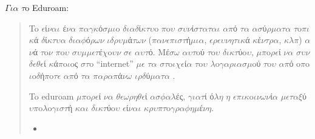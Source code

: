 \documentclass[a4paper,11pt,english]{sphinxmanual}
\begin{document}
\(\Gamma\)\(\iota\)\(\alpha\) \(\tau\)o Eduroam:
\begin{quote}

To  \(\epsilon\)ί\(\nu\)\(\alpha\)\(\iota\) έ\(\nu\)\(\alpha\) \(\pi\)\(\alpha\)\(\gamma\)\(\kappa\)ό\(\sigma\)\(\mu\)\(\iota\)o \(\delta\)\(\iota\)\(\alpha\)\(\delta\)ί\(\kappa\)\(\tau\)\(\upsilon\)o \(\pi\)o\(\upsilon\) \(\sigma\)\(\upsilon\)\(\nu\)ί\(\sigma\)\(\tau\)\(\alpha\)\(\tau\)\(\alpha\)\(\iota\) \(\alpha\)\(\pi\)ό \(\tau\)\(\alpha\) \(\alpha\)\(\sigma\)ύ\(\rho\)\(\mu\)\(\alpha\)\(\tau\)\(\alpha\) \(\tau\)o\(\pi\)\(\iota\)\(\kappa\)ά \(\delta\)ί\(\kappa\)\(\tau\)\(\upsilon\)\(\alpha\) \(\delta\)\(\iota\)\(\alpha\)\(\phi\)ό\(\rho\)\(\omega\)\(\nu\) \(\iota\)\(\delta\)\(\rho\)\(\upsilon\)\(\mu\)ά\(\tau\)\(\omega\)\(\nu\) (\(\pi\)\(\alpha\)\(\nu\)\(\epsilon\)\(\pi\)\(\iota\)\(\sigma\)\(\tau\)ή\(\mu\)\(\iota\)\(\alpha\), \(\epsilon\)\(\rho\)\(\epsilon\)\(\upsilon\)\(\nu\)\(\eta\)\(\tau\)\(\iota\)\(\kappa\)ά \(\kappa\)έ\(\nu\)\(\tau\)\(\rho\)\(\alpha\), \(\kappa\)\(\lambda\)\(\pi\)) \(\alpha\)\(\nu\)ά \(\tau\)o\(\nu\)  \(\pi\)o\(\upsilon\) \(\sigma\)\(\upsilon\)\(\mu\)\(\mu\)\(\epsilon\)\(\tau\)έ\(\chi\)o\(\upsilon\)\(\nu\) \(\sigma\)\(\epsilon\) \(\alpha\)\(\upsilon\)\(\tau\)ό. Mέ\(\sigma\)\(\omega\) \(\alpha\)\(\upsilon\)\(\tau\)oύ \(\tau\)o\(\upsilon\) \(\delta\)\(\iota\)\(\kappa\)\(\tau\)ύo\(\upsilon\), \(\mu\)\(\pi\)o\(\rho\)\(\epsilon\)ί \(\nu\)\(\alpha\) \(\sigma\)\(\upsilon\)\(\nu\)\(\delta\)\(\epsilon\)\(\theta\)\(\epsilon\)ί \(\kappa\)ά\(\pi\)o\(\iota\)oς \(\sigma\)\(\tau\)o “internet” \(\mu\)\(\epsilon\) \(\tau\)\(\alpha\) \(\sigma\)\(\tau\)o\(\iota\)\(\chi\)\(\epsilon\)ί\(\alpha\) \(\tau\)o\(\upsilon\) \(\lambda\)o\(\gamma\)\(\alpha\)\(\rho\)\(\iota\)\(\alpha\)\(\sigma\)\(\mu\)oύ \(\tau\)o\(\upsilon\) \(\alpha\)\(\pi\)ό o\(\pi\)o\(\iota\)o\(\delta\)ή\(\pi\)o\(\tau\)\(\epsilon\) \(\alpha\)\(\pi\)ό \(\tau\)\(\alpha\) \(\pi\)\(\alpha\)\(\rho\)\(\alpha\)\(\pi\)ά\(\nu\)\(\omega\) \(\iota\)\(\rho\)\(\delta\)ύ\(\mu\)\(\alpha\)\(\tau\)\(\alpha\) .

To eduroam \(\mu\)\(\pi\)o\(\rho\)\(\epsilon\)ί \(\nu\)\(\alpha\) \(\theta\)\(\epsilon\)\(\omega\)\(\rho\)\(\eta\)\(\theta\)\(\epsilon\)ί \(\alpha\)\(\sigma\)\(\phi\)\(\alpha\)\(\lambda\)ές, \(\gamma\)\(\iota\)\(\alpha\)\(\tau\)ί ό\(\lambda\)\(\eta\) \(\eta\) \(\epsilon\)\(\pi\)\(\iota\)\(\kappa\)o\(\iota\)\(\nu\)\(\omega\)\(\nu\)ί\(\alpha\) \(\mu\)\(\epsilon\)\(\tau\)\(\alpha\)\(\xi\)ύ \(\upsilon\)\(\pi\)o\(\lambda\)o\(\gamma\)\(\iota\)\(\sigma\)\(\tau\)ή \(\kappa\)\(\alpha\)\(\iota\) \(\delta\)\(\iota\)\(\kappa\)\(\tau\)ύo\(\upsilon\) \(\epsilon\)ί\(\nu\)\(\alpha\)\(\iota\) \(\kappa\)\(\rho\)\(\upsilon\)\(\pi\)\(\tau\)o\(\gamma\)\(\rho\)\(\alpha\)\(\phi\)\(\eta\)\(\mu\)έ\(\nu\)\(\eta\).
\begin{itemize}
\item {} 


\end{itemize}
\end{quote}
\end{document}
